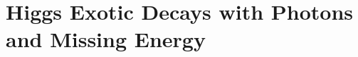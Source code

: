 \chapter{Higgs Exotic Decays with Photons and Missing Energy}
\graphicspath{{monophoton/analysis_figs/}{monophoton/}}









